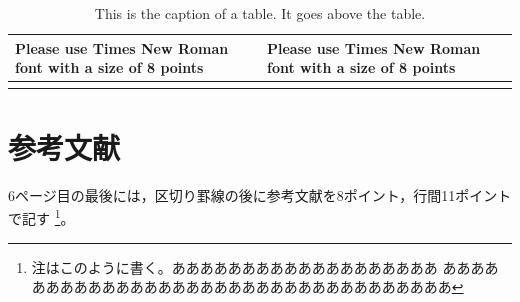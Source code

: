 \documentclass[base=10pt,magstyle=real,a4paper,twocolumn,xelatex,pandoc,jafont=noto]{bxjsarticle}%
\begin{document}
\begin{table}[H]
	\caption{This is the caption of a table. It goes above the table.}
	\label{tab:joho}
	\fontsize{8pt}{10pt}\selectfont
	\centering
	\begin{tabular}{|p{36mm}|p{36mm}|}
		\hline 
		Please use Times New Roman font with a size of 8 points
		& Please use Times New Roman font with a size of 8 points
		\\ 
		\hline
		 & \\
		\hline
	\end{tabular} 
\end{table}


\section{参考文献}
6ページ目の最後には，区切り罫線の後に参考文献を8ポイント，行間11ポイントで記す
\footnote{注はこのように書く。あああああああああああああああああああ
ああああああああああああああああああああああああああああああああああ}。
\end{document}
